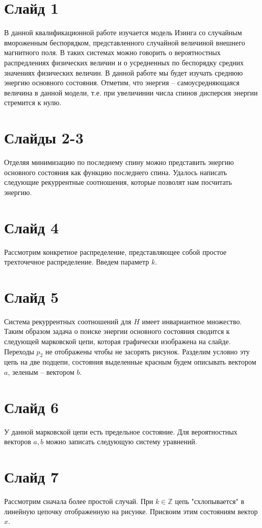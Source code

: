 \documentclass[a4paper]{article}
\begin{document}
\section*{Слайд 1}
В данной квалификационной работе изучается модель Изинга со случайным вмороженным беспорядком, представленного случайной величиной внешнего магнитного поля. 
В таких системах можно говорить о вероятностных распредлениях физических величин и о усредненных по беспорядку средних значениях физических величин. В данной работе мы будет изучать среднюю энергию основного состояния. Отметим, что энергия -- самоусредняющаяся величина в данной модели, т.е. при увеличинии числа спинов дисперсия энергии стремится к нулю.

\section*{Слайды 2-3}
Отделяя минимизацию по последнему спину можно представить энергию основного состояния как функцию последнего спина. Удалось написать следующие рекуррентные соотношения, которые позволят нам посчитать энергию.

\section*{Слайд 4}
Рассмотрим конкретное распределение, представляющее собой простое трехточечное распределение. Введем параметр $k$.

\section*{Слайд 5}
Система рекуррентных соотношений для $H$ имеет инвариантное множество. Таким образом задача о поиске энергии основного состояния сводится к следующей марковской цепи, которая графически изображена на слайде. Переходы $p_2$ не отображены чтобы не засорять рисунок. Разделим условно эту цепь на две подцепи, состояния выделенные красным будем описывать вектором $a$, зеленым -- вектором $b$.
\section*{Слайд 6}
У данной марковской цепи есть предельное состояние. Для вероятностных векторов $a,b$ можно записать следующую систему уравнений.

\section*{Слайд 7}
Рассмотрим сначала более простой случай. При $k \in \mathbb{Z}$ цепь "схлопывается" в линейную цепочку отображенную на рисунке. Присвоим этим состояниям вектор $x$.
\end{document}
